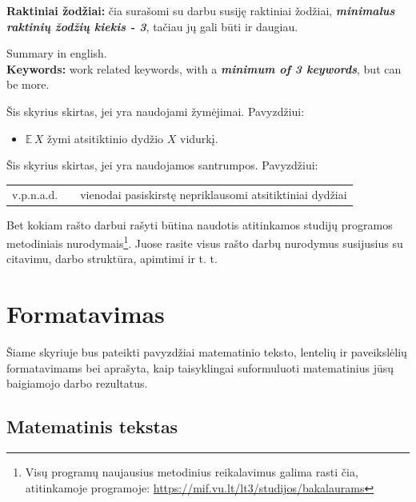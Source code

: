 \documentclass[]{VUMIFTemplateClass}
\newcommand{\EE}{\mathbb{E}\,} %
\begin{document}
\textbf{Raktiniai žodžiai:} čia surašomi su darbu susiję raktiniai žodžiai, \textit{\textbf{minimalus raktinių žodžių kiekis - 3}}, tačiau jų gali būti ir daugiau.



Summary in english.\\

\textbf{Keywords:} work related keywords, with a \textit{\textbf{minimum of 3 keywords}}, but can be more.


\singlespacing

\listoffigures 

\listoftables

\tableofcontents
\onehalfspacing


Šis skyrius skirtas, jei yra naudojami žymėjimai. Pavyzdžiui:    
\begin{itemize}
    \item $\EE X$ žymi atsitiktinio dydžio $X$ vidurkį.
\end{itemize}

Šis skyrius skirtas, jei yra naudojamos santrumpos. Pavyzdžiui:

\begin{tabular}{rcp{}}
    {v.p.n.a.d.} & {} & {vienodai pasiskirstę nepriklausomi atsitiktiniai dydžiai}
\end{tabular}

Bet kokiam rašto darbui rašyti būtina naudotis atitinkamos studijų programos metodiniais nurodymais\footnote{Visų programų naujausius metodinius reikalavimus galima rasti čia, atitinkamoje programoje: \url{https://mif.vu.lt/lt3/studijos/bakalaurams}}. Juose rasite visus rašto darbų nurodymus susijusius su citavimu, darbo struktūra, apimtimi ir t. t.


\section{Formatavimas}

Šiame skyriuje bus pateikti pavyzdžiai matematinio teksto, lentelių ir paveikslėlių formatavimams bei aprašyta, kaip taisyklingai suformuluoti matematinius jūsų baigiamojo darbo rezultatus.

\subsection{Matematinis tekstas}
\end{document}
